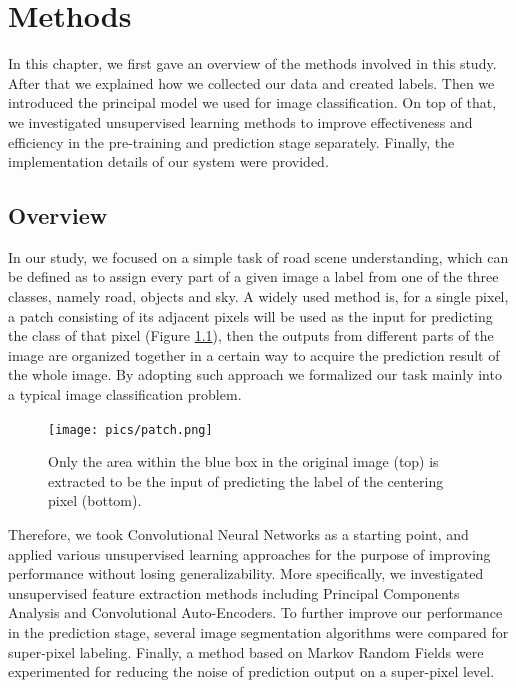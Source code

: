 
\chapter{Methods}
\label{cha:Methods}

In this chapter, we first gave an overview of the methods involved in this study. After that we explained how we collected our data and created labels. Then we introduced the principal model we used for image classification. On top of that, we investigated unsupervised learning methods to improve effectiveness and efficiency in the pre-training and prediction stage separately. Finally, the implementation details of our system were provided.

\section{Overview}
\label{sec:Overview}
In our study, we focused on a simple task of road scene understanding, which can be defined as to assign every part of a given image a label from one of the three classes, namely road, objects and sky. A widely used method is, for a single pixel, a patch consisting of its adjacent pixels will be used as the input for predicting the class of that pixel (Figure \ref{patchfig}), then the outputs from different parts of the image are organized together in a certain way to acquire the prediction result of the whole image. By adopting such approach we formalized our task mainly into a typical image classification problem.

\begin{figure}[h!]
\centering
\texttt{[image: pics/patch.png]}
\caption{Only the area within the blue box in the original image (top) is extracted to be the input of predicting the label of the centering pixel (bottom).}
\label{patchfig}
\end{figure}

Therefore, we took Convolutional Neural Networks as a starting point, and applied various unsupervised learning approaches for the purpose of improving performance without losing generalizability. More specifically, we investigated unsupervised feature extraction methods including Principal Components Analysis and Convolutional Auto-Encoders. To further improve our performance in the prediction stage, several image segmentation algorithms were compared for super-pixel labeling. Finally, a method based on Markov Random Fields were experimented for reducing the noise of prediction output on a super-pixel level.

